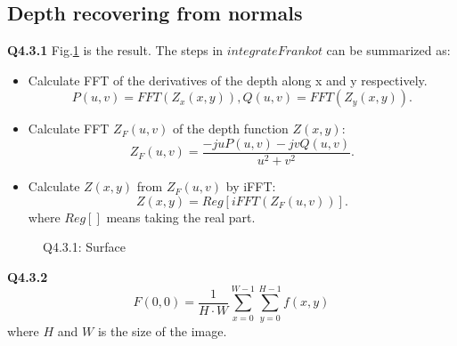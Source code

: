 \documentclass[
  course = {{16-720B Computer Vision}},
  quartile = {{1}},
  assignment = 5\ -\ 3D\ Reconstruction\ \&\ Photometric\ Stereo,
  name = {{Kangle Deng}},
  email = {{kangled@andrew.cmu.edu}},
  firstexercise = 1
]{aga-homework}
\begin{document}
\subsection{Depth recovering from normals}

\noindent\textbf{Q4.3.1} Fig.\ref{fig:cv_hw5_q431} is the result. The steps in $integrateFrankot$ can be summarized as:

\begin{itemize}
    \item Calculate FFT of the derivatives of the depth along x and y respectively.
    \begin{equation*}
        P(u,v) = FFT(Z_x(x,y)), Q(u,v) = FFT(Z_y(x,y)).
    \end{equation*}
    \item Calculate FFT $Z_F(u,v)$ of the depth function $Z(x,y)$:
    \begin{equation*}
        Z_F(u, v) = \frac{-juP(u,v)-jvQ(u,v)}{u^2+v^2}.
    \end{equation*}
    \item Calculate $Z(x,y)$ from $Z_F(u,v)$ by iFFT:
    \begin{equation*}
        Z(x,y) = Reg[iFFT(Z_F(u, v))].
    \end{equation*}
    where $Reg[]$ means taking the real part.
\end{itemize}

\begin{figure}
    \centering
    \caption{Q4.3.1: Surface}
    \label{fig:cv_hw5_q431}
\end{figure}

\noindent\textbf{Q4.3.2} 
\begin{equation*}
    F(0,0) = \frac{1}{H\cdot W} \sum\limits_{x=0}^{W-1} \sum\limits_{y=0}^{H-1} f(x,y)
\end{equation*}
where $H$ and $W$ is the size of the image.
\end{document}
